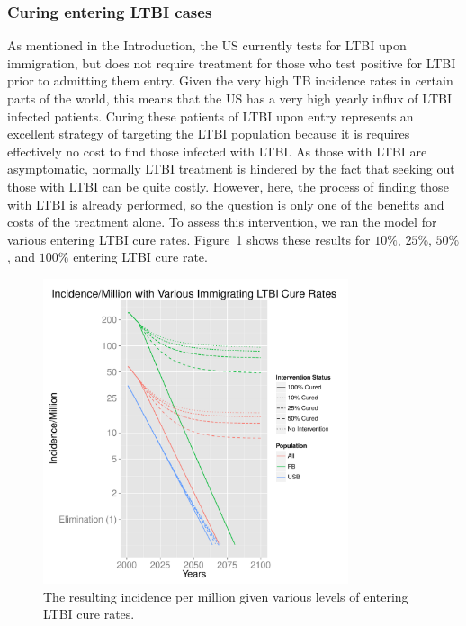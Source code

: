 \documentclass{amsart}
\renewcommand{\(}{\left(}
\renewcommand{\)}{\right)}
\begin{document}
\subsubsection{Curing entering LTBI cases}
As mentioned in the Introduction, the US currently tests for LTBI upon
immigration, but does not require treatment for those who test positive for LTBI
prior to admitting them entry. Given the very high TB incidence rates in certain
parts of the world, this means that the US has a very high yearly influx of LTBI
infected patients.  Curing these patients of LTBI upon entry represents an
excellent strategy of targeting the LTBI population because it is requires
effectively no cost to find those infected with LTBI. As those with LTBI are
asymptomatic, normally LTBI treatment is hindered by the fact that seeking out
those with LTBI can be quite costly. However, here, the process of finding those
with LTBI is already performed, so the question is only one of the benefits and
costs of the treatment alone. To assess this intervention, we ran the model for
various entering LTBI cure rates. Figure~\ref{fig:redEnLTBIInc} shows these
results for $10\%$, $25\%$, $50\%$, and $100\%$ entering LTBI cure rate. 
\begin{figure}[h]
  \centering
  \includegraphics[width=0.8\textwidth]{figures/redEnLTBI}
  \caption{The resulting incidence per million given various levels of entering
    LTBI cure rates.}
  \label{fig:redEnLTBIInc}
\end{figure}
\end{document}
